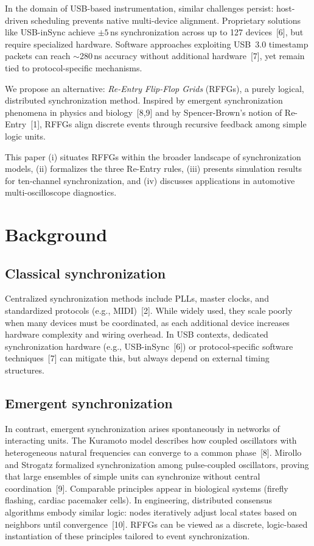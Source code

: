 \documentclass[11pt]{article}
\begin{document}
In the domain of USB-based instrumentation, similar challenges persist: host-driven scheduling prevents native multi-device alignment. Proprietary solutions like USB-inSync achieve $\pm 5$\,ns synchronization across up to 127 devices~[6], but require specialized hardware. Software approaches exploiting USB~3.0 timestamp packets can reach $\sim$280\,ns accuracy without additional hardware~[7], yet remain tied to protocol-specific mechanisms.

We propose an alternative: \textit{Re-Entry Flip-Flop Grids} (RFFGs), a purely logical, distributed synchronization method. Inspired by emergent synchronization phenomena in physics and biology~[8,9] and by Spencer-Brown’s notion of Re-Entry~[1], RFFGs align discrete events through recursive feedback among simple logic units.

This paper (i) situates RFFGs within the broader landscape of synchronization models, (ii) formalizes the three Re-Entry rules, (iii) presents simulation results for ten-channel synchronization, and (iv) discusses applications in automotive multi-oscilloscope diagnostics.

\section{Background}

\subsection{Classical synchronization}
Centralized synchronization methods include PLLs, master clocks, and standardized protocols (e.g., MIDI)~[2]. While widely used, they scale poorly when many devices must be coordinated, as each additional device increases hardware complexity and wiring overhead. In USB contexts, dedicated synchronization hardware (e.g., USB-inSync~[6]) or protocol-specific software techniques~[7] can mitigate this, but always depend on external timing structures.

\subsection{Emergent synchronization}
In contrast, emergent synchronization arises spontaneously in networks of interacting units. The Kuramoto model describes how coupled oscillators with heterogeneous natural frequencies can converge to a common phase~[8]. Mirollo and Strogatz formalized synchronization among pulse-coupled oscillators, proving that large ensembles of simple units can synchronize without central coordination~[9]. Comparable principles appear in biological systems (firefly flashing, cardiac pacemaker cells). In engineering, distributed consensus algorithms embody similar logic: nodes iteratively adjust local states based on neighbors until convergence~[10]. RFFGs can be viewed as a discrete, logic-based instantiation of these principles tailored to event synchronization.
\end{document}
